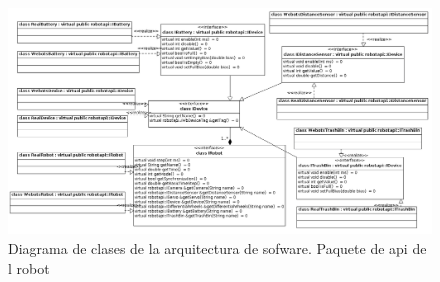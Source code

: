 \begin{landscape}
\begin{figure}[h]
	\centering
	\includegraphics[scale=0.5]{comportamientos/figures/api2.png}
	\caption[Arquitectura de software: api de robot]{Diagrama de clases de la arquitectura
			de sofware. Paquete de api de l robot}
	\label{fig:soft_arq_devices}
\end{figure}
\end{landscape}

